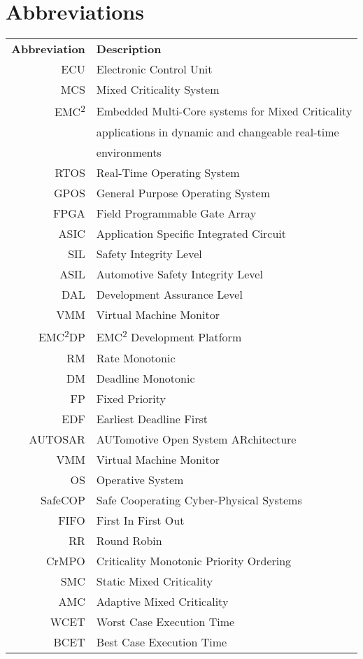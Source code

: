 \chapter*{Abbreviations}
\begin{tabular}{r l}
\textbf{Abbreviation} 	& \textbf{Description} \vspace{.5em} \\
ECU		&Electronic Control Unit\\
MCS		&Mixed Criticality System\\
EMC\textsuperscript{2}	&Embedded Multi-Core systems for Mixed Criticality\\
 		&applications in dynamic and changeable real-time\\
 		&environments\\
RTOS	&Real-Time Operating System\\
GPOS	&General Purpose Operating System\\
FPGA	&Field Programmable Gate Array\\
ASIC	&Application Specific Integrated Circuit\\
SIL		&Safety Integrity Level\\
ASIL	&Automotive Safety Integrity Level\\
DAL		&Development Assurance Level\\
VMM		&Virtual Machine Monitor\\
EMC\textsuperscript{2}DP	&EMC\textsuperscript{2} Development Platform\\
RM		&Rate Monotonic\\
DM		&Deadline Monotonic\\
FP		&Fixed Priority\\
EDF		&Earliest Deadline First\\
AUTOSAR	&AUTomotive Open System ARchitecture\\
VMM		&Virtual Machine Monitor\\
OS		&Operative System\\
SafeCOP	&Safe Cooperating Cyber-Physical Systems\\
FIFO	&First In First Out\\
RR		&Round Robin\\
CrMPO	&Criticality Monotonic Priority Ordering\\
SMC		&Static Mixed Criticality\\
AMC		&Adaptive Mixed Criticality\\
WCET	&Worst Case Execution Time\\
BCET	&Best Case Execution Time\\

\end{tabular}
